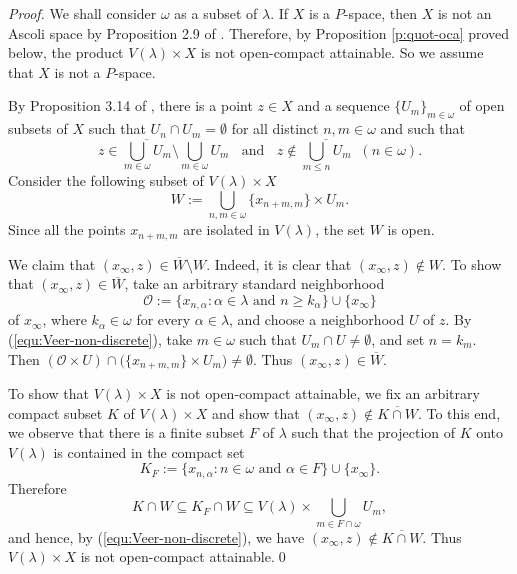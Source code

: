 \documentclass[preprint,11pt]{elsarticle}
\numberwithin{equation}{section}
\numberwithin{theorem}{section}
\newcommand{\w}{\omega}
\newcommand{\SM}{{\setminus}}
\begin{document}
\begin{proof}
We shall consider $\w$ as a subset of $\lambda$.
If $X$ is a $P$-space, then $X$ is not an Ascoli space by Proposition 2.9 of \cite{Gabr:weak-bar-L(X)}. Therefore, by Proposition \ref{p:quot-oca} proved below, the product  $V(\lambda)\times X$ is not open-compact attainable. So we assume that $X$ is not a $P$-space.

By Proposition 3.14 of \cite{Gab-Pel}, there is a point $z\in X$ and a sequence $\{U_m\}_{m\in\w}$ of open subsets of $X$ such that $U_n\cap U_m=\emptyset$ for all distinct $n,m\in \w$ and such that
\begin{equation} \label{equ:Veer-non-discrete}
z\in \overline{\bigcup_{m\in\w} U_m} \setminus \bigcup_{m\in\w} U_m \;\;\mbox{ and }\;\; z \not\in \overline{\bigcup_{m\leq n} U_m} \;\; (n\in \w).
\end{equation}
Consider the following subset of $V(\lambda)\times X$
\[
W:=\bigcup_{n,m\in\w} \big\{x_{n+m,m}\big\}\times U_m.
\]
Since all the points $x_{n+m,m}$ are isolated in $V(\lambda)$, the set $W$ is open.

We claim that $(x_\infty,z)\in \overline{W}\SM W$. Indeed, it is clear that $(x_\infty,z)\not\in W$. To show that $(x_\infty,z)\in \overline{W}$, take an arbitrary standard neighborhood
\[
\mathcal{O}:=\{ x_{n,\alpha}: \alpha\in\lambda \mbox{ and } n\geq k_\alpha\}\cup\{ x_\infty\}
\]
of $x_\infty$, where $k_\alpha\in \w$ for every $ \alpha\in\lambda$, and choose a neighborhood $U$ of $z$. By (\ref{equ:Veer-non-discrete}), take $m\in\w$ such that $U_m\cap U\not=\emptyset$, and set $n=k_m$. Then $(\mathcal{O}\times U)\cap \big(\big\{x_{n+m,m}\big\}\times U_m\big) \not=\emptyset$. Thus $(x_\infty,z)\in \overline{W}$.

To show that $V(\lambda)\times X$ is not open-compact attainable, we fix an arbitrary compact subset  $K$ of $V(\lambda)\times X$ and show that $(x_\infty,z)\not\in \overline{K\cap W}$. To this end,  we observe that there is a finite subset $F$ of $\lambda$ such that the projection of $K$ onto $V(\lambda)$ is contained in the compact set
\[
K_F :=\big\{ x_{n,\alpha}: n\in\w \mbox{ and } \alpha\in F\big\}\cup\{ x_\infty\}.
\]
Therefore
\[
K\cap W \subseteq K_F\cap W \subseteq V(\lambda)\times \bigcup_{m\in F\cap \w} U_m,
\]
and hence, by (\ref{equ:Veer-non-discrete}), we have  $(x_\infty,z)\not\in \overline{K\cap W}$. Thus $V(\lambda)\times X$ is not open-compact attainable.\qed
\end{proof}
\end{document}
